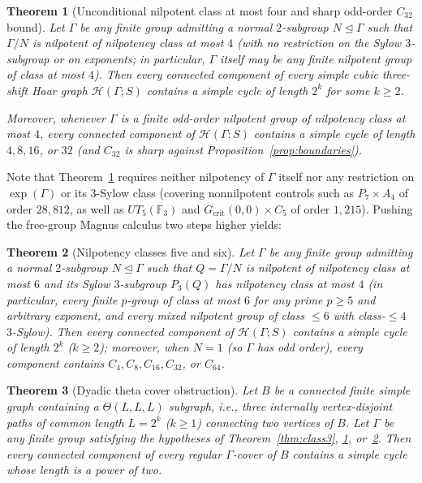 \documentclass[11pt]{amsart}
\newtheorem{theorem}{Theorem}[section]
\theoremstyle{definition}
\theoremstyle{remark}
\newcommand{\F}{\mathbb{F}}
\newcommand{\Haar}{\mathcal{H}}
\begin{document}
\begin{theorem}[Unconditional nilpotent class at most four and sharp odd-order $C_{32}$ bound]\label{thm:class4}
Let $\Gamma$ be any finite group admitting a normal $2$-subgroup $N \trianglelefteq \Gamma$ such that $\Gamma/N$ is nilpotent of nilpotency class at most $4$ (with no restriction on the Sylow $3$-subgroup or on exponents; in particular, $\Gamma$ itself may be any finite nilpotent group of class at most $4$). Then every connected component of every simple cubic three-shift Haar graph $\Haar(\Gamma; S)$ contains a simple cycle of length $2^k$ for some $k \ge 2$.

Moreover, whenever $\Gamma$ is a finite odd-order nilpotent group of nilpotency class at most $4$, every connected component of $\Haar(\Gamma; S)$ contains a simple cycle of length $4, 8, 16$, or $32$ (and $C_{32}$ is sharp against Proposition~\ref{prop:boundaries}).
\end{theorem}

Note that Theorem~\ref{thm:class4} requires neither nilpotency of $\Gamma$ itself nor any restriction on $\exp(\Gamma)$ or its $3$-Sylow class (covering nonnilpotent controls such as $P_7 \times A_4$ of order $28{,}812$, as well as $UT_5(\F_3)$ and $G_{\mathrm{crit}}(0,0) \times C_5$ of order $1{,}215$). Pushing the free-group Magnus calculus two steps higher yields:

\begin{theorem}[Nilpotency classes five and six]\label{thm:class6}
Let $\Gamma$ be any finite group admitting a normal $2$-subgroup $N \trianglelefteq \Gamma$ such that $Q = \Gamma/N$ is nilpotent of nilpotency class at most $6$ and its Sylow $3$-subgroup $P_3(Q)$ has nilpotency class at most $4$ (in particular, every finite $p$-group of class at most $6$ for any prime $p \ge 5$ and arbitrary exponent, and every mixed nilpotent group of class $\le 6$ with class-$\le 4$ $3$-Sylow). Then every connected component of $\Haar(\Gamma; S)$ contains a simple cycle of length $2^k$ ($k \ge 2$); moreover, when $N = 1$ (so $\Gamma$ has odd order), every component contains $C_4, C_8, C_{16}, C_{32}$, or $C_{64}$.
\end{theorem}

\begin{theorem}[Dyadic theta cover obstruction]\label{thm:theta}
Let $B$ be a connected finite simple graph containing a $\Theta(L,L,L)$ subgraph, i.e., three internally vertex-disjoint paths of common length $L = 2^k$ ($k \ge 1$) connecting two vertices of $B$. Let $\Gamma$ be any finite group satisfying the hypotheses of Theorem~\ref{thm:class3}, \ref{thm:class4}, or~\ref{thm:class6}. Then every connected component of every regular $\Gamma$-cover of $B$ contains a simple cycle whose length is a power of two.
\end{theorem}
\end{document}
